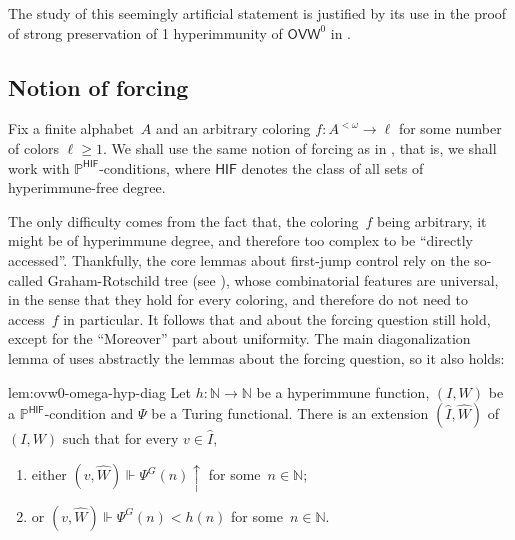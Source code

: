 \documentclass{article}
\def\h{\hat}
\def\forces{\Vdash}
\def\PP{\mathbb{P}}
\newcommand{\OVW}[0]{\mathsf{OVW}}
\newcommand{\IOIHJ}[0]{\exists^\infty\mbox{-}\mathsf{IHJ}}
\newcommand{\NN}[0]{\mathbb{N}}
\def\qt#1{``#1''}%
\newtheorem{theorem}{Theorem}
\numberwithin{theorem}{section}
\theoremstyle{definition}
\begin{document}

The study of this seemingly artificial statement is justified by its use in the proof of strong preservation of 1 hyperimmunity of $\OVW^0$ in . 


\subsection{Notion of forcing}

Fix a finite alphabet~$A$ and an arbitrary coloring $f : A^{<\omega} \to \ell$ for some number of colors $\ell \geq 1$. We shall use the same notion of forcing as in , that is, we shall work with $\PP^{\mathsf{HIF}}$-conditions, where $\mathsf{HIF}$ denotes the class of all sets of hyperimmune-free degree.

The only difficulty comes from the fact that, the coloring~$f$ being arbitrary, it might be of hyperimmune degree, and therefore too complex to be \qt{directly accessed}. Thankfully, the core lemmas about first-jump control rely on the so-called Graham-Rotschild tree (see ), whose combinatorial features are universal, in the sense that they hold for every coloring, and therefore do not need to access~$f$ in particular. It follows that  and  about the forcing question still hold, except for the \qt{Moreover} part about uniformity. The main diagonalization lemma of  uses abstractly the lemmas about the forcing question, so it also holds:

\begin{replemma}{lem:ovw0-omega-hyp-diag}
Let $h : \NN \to \NN$ be a hyperimmune function, $(I, W)$ be a $\PP^{\mathsf{HIF}}$-condition
and $\Psi$ be a Turing functional. There is an extension $(\h I,\h W)$ of $ (I, W)$ such that
for every $v \in \h I$,
\begin{enumerate}[label=(\arabic*)]
\item either $(v, \h W)\forces \Psi^G(n)\uparrow$ for some~$n \in \NN$;
\item or $(v, \h W)\forces \Psi^G(n) < h(n)$ for some~$n \in \NN$.
\end{enumerate}
\end{replemma}
\end{document}
